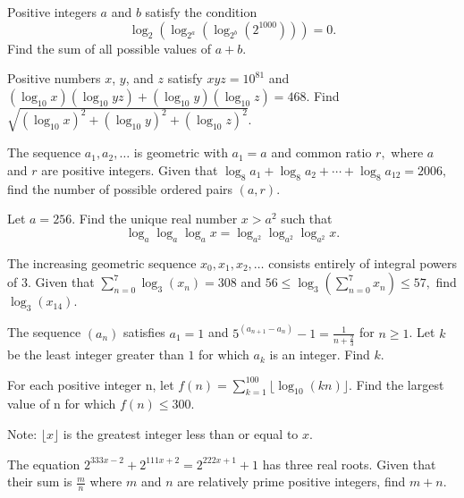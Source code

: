 \documentclass[mast]{lucky}
\begin{document}
\begin{prob}[AIME II 2013/2]{3}
Positive integers $a$ and $b$ satisfy the condition \[\log_2(\log_{2^a}(\log_{2^b}(2^{1000}))) = 0.\] Find the sum of all possible values of $a+b$.
\end{prob}

\begin{req}[AIME II 2010/5]{3}
Positive numbers $x$, $y$, and $z$ satisfy $xyz = 10^{81}$ and $(\log_{10}x)(\log_{10} yz) + (\log_{10}y) (\log_{10}z) = 468$. Find $\sqrt {(\log_{10}x)^2 + (\log_{10}y)^2 + (\log_{10}z)^2}$.
\end{req}

\begin{prob}[AIME I 2006/9]{3}
The sequence $a_1, a_2, \ldots$ is geometric with $a_1=a$ and common ratio $r,$ where $a$ and $r$ are positive integers. Given that $\log_8 a_1+\log_8 a_2+\cdots+\log_8 a_{12} = 2006,$ find the number of possible ordered pairs $(a,r).$
\end{prob}

\begin{prob}[HMMT 2020]{4}
Let $a=256$. Find the unique real number $x>a^2$ such that
\[\log_a \log_a \log_a x = \log_{a^2} \log_{a^2} \log_{a^2} x.\]
\end{prob}

\begin{prob}[AIME II 2007/12]{4}
The increasing geometric sequence $x_{0},x_{1},x_{2},\ldots$ consists entirely of integral powers of $3.$ Given that $\sum_{n=0}^{7}\log_{3}(x_{n}) = 308$ and $56 \leq \log_{3}\left ( \sum_{n=0}^{7}x_{n}\right ) \leq 57,$ find $\log_{3}(x_{14}).$
\end{prob}

\begin{prob}[AIME I 2009/7]{4}
The sequence $(a_n)$ satisfies $a_1 = 1$ and $5^{(a_{n + 1} - a_n)} - 1 = \frac {1}{n + \frac {2}{3}}$ for $n \geq 1$. Let $k$ be the least integer greater than $1$ for which $a_k$ is an integer. Find $k$.
\end{prob}

\begin{prob}[AIME I 2010/14]{4}
For each positive integer n, let $f(n) = \sum_{k = 1}^{100} \lfloor \log_{10} (kn) \rfloor$. Find the largest value of n for which $f(n) \le 300$.

Note: $\lfloor x \rfloor$ is the greatest integer less than or equal to $x$.
\end{prob}

\begin{req}[AIME I 2005/8]{6}
The equation $2^{333x-2} + 2^{111x+2} = 2^{222x+1} + 1$ has three real roots. Given that their sum is $\frac mn$ where $m$ and $n$ are relatively prime positive integers, find $m+n.$
\end{req}
\end{document}
